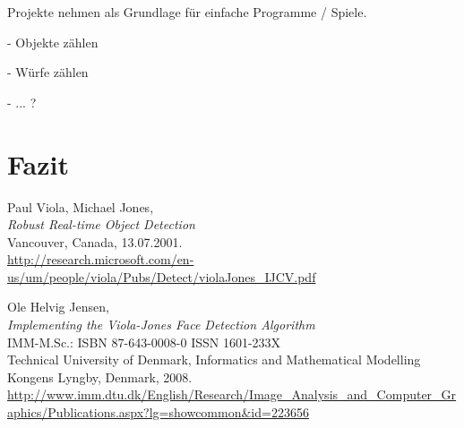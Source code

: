 \documentclass[12pt,a4paper,ngerman]{scrartcl}
\begin{document}
Projekte nehmen als Grundlage für einfache Programme / Spiele.

- Objekte zählen

- Würfe zählen

- ... ?

\section{Fazit}




\newpage



\newpage
{}
{}
\renewcommand{\refname}{Quellen}

\begin{thebibliography}{99}

Paul Viola, Michael Jones,\\
{\em Robust Real-time Object Detection}\\
Vancouver, Canada, 13.07.2001.\\
\url{http://research.microsoft.com/en-us/um/people/viola/Pubs/Detect/violaJones_IJCV.pdf}

Ole Helvig Jensen,\\
{\em Implementing the Viola-Jones Face Detection Algorithm}\\
IMM-M.Sc.: ISBN 87-643-0008-0 \qquad ISSN 1601-233X\\
Technical University of Denmark, Informatics and Mathematical Modelling\\
Kongens Lyngby, Denmark, 2008.\\
\url{http://www.imm.dtu.dk/English/Research/Image_Analysis_and_Computer_Graphics/Publications.aspx?lg=showcommon&id=223656}

\end{thebibliography}
\end{document}
